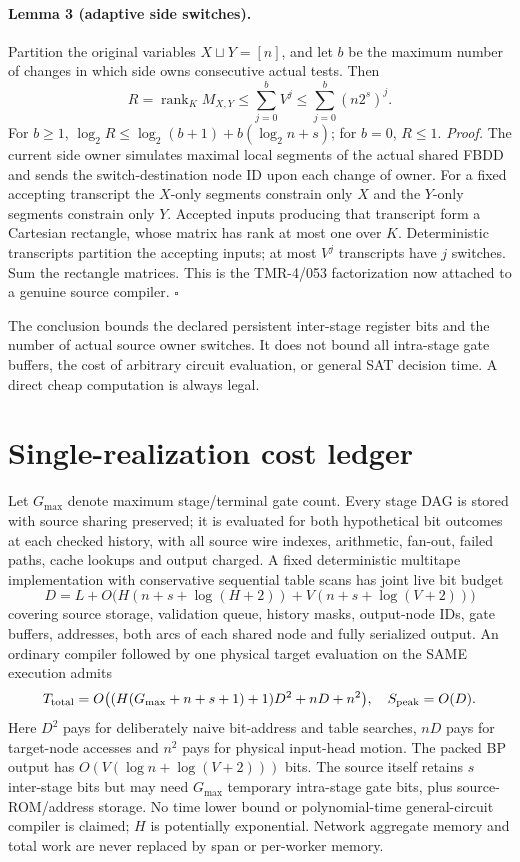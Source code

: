 \documentclass[11pt]{article}
\begin{document}
\paragraph{Lemma 3 (adaptive side switches).}
Partition the original variables $X\sqcup Y=[n]$, and let $b$ be the maximum number of changes in which side owns consecutive actual tests. Then
\[
R=\operatorname{rank}_K M_{X,Y}
\leq\sum_{j=0}^{b}V^j
\leq\sum_{j=0}^{b}(n2^s)^j.
\]
For $b\geq1$, $\log_2R\leq\log_2(b+1)+b(\log_2 n+s)$; for $b=0$, $R\leq1$.
\emph{Proof.} The current side owner simulates maximal local segments of the actual shared FBDD and sends the switch-destination node ID upon each change of owner. For a fixed accepting transcript the $X$-only segments constrain only $X$ and the $Y$-only segments constrain only $Y$. Accepted inputs producing that transcript form a Cartesian rectangle, whose matrix has rank at most one over $K$. Deterministic transcripts partition the accepting inputs; at most $V^j$ transcripts have $j$ switches. Sum the rectangle matrices. This is the TMR-4/053 factorization now attached to a genuine source compiler. \hfill$\square$

The conclusion bounds the declared persistent inter-stage register bits and the number of actual source owner switches. It does not bound all intra-stage gate buffers, the cost of arbitrary circuit evaluation, or general SAT decision time. A direct cheap computation is always legal.

\section{Single-realization cost ledger}
Let $G_{\max}$ denote maximum stage/terminal gate count. Every stage DAG is stored with source sharing preserved; it is evaluated for both hypothetical bit outcomes at each checked history, with all source wire indexes, arithmetic, fan-out, failed paths, cache lookups and output charged. A fixed deterministic multitape implementation with conservative sequential table scans has joint live bit budget
\[
D=L+O\bigl(H(n+s+\log(H+2))+V(n+s+\log(V+2))\bigr)
\]
covering source storage, validation queue, history masks, output-node IDs, gate buffers, addresses, both arcs of each shared node and fully serialized output. An ordinary compiler followed by one physical target evaluation on the SAME execution admits
\[
T_{\rm total}=O\bigl((H(G_{\max}+n+s+1)+1)D^2+nD+n^2\bigr),
\quad S_{\rm peak}=O(D).
\]
Here $D^2$ pays for deliberately naive bit-address and table searches, $nD$ pays for target-node accesses and $n^2$ pays for physical input-head motion. The packed BP output has $O(V(\log n+\log(V+2)))$ bits. The source itself retains $s$ inter-stage bits but may need $G_{\max}$ temporary intra-stage gate bits, plus source-ROM/address storage. No time lower bound or polynomial-time general-circuit compiler is claimed; $H$ is potentially exponential. Network aggregate memory and total work are never replaced by span or per-worker memory.
\end{document}
